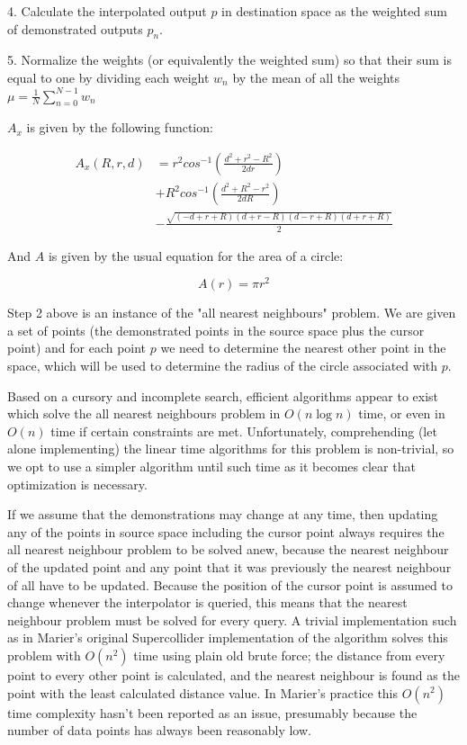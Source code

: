 \documentclass[main.tex]{subfiles}
\begin{document}
4. Calculate the interpolated output $p$ in destination space as the weighted
sum of demonstrated outputs $p_n$.

5. Normalize the weights (or equivalently the weighted sum) so that their sum
is equal to one by dividing each weight $w_n$ by the mean of all the weights
$\mu = \frac{1}{N}\sum_{n = 0}^{N - 1} w_n$

$A_x$ is given by the following function:

\[
\begin{aligned}
A_x(R, r, d) &= r^2 cos^{-1} ( \frac{d^2 + r^2 - R^2}{2dr} ) \\
             &+ R^2 cos^{-1} ( \frac{d^2 + R^2 - r^2}{2dR} ) \\
             &- \frac{\sqrt{(-d + r + R)(d + r - R)(d - r + R)(d + r + R)}}{2}
\end{aligned}
\]

And $A$ is given by the usual equation for the area of a circle:

\[
A(r) = \pi r^2
\]

Step 2 above is an instance of the "all nearest neighbours" problem. We are
given a set of points (the demonstrated points in the source space plus the
cursor point) and for each point $p$ we need to determine the nearest other
point in the space, which will be used to determine the
radius of the circle associated with $p$.

Based on a cursory and incomplete search, efficient
algorithms appear to exist which solve the all nearest neighbours problem in
$O(n\log n)$ time, or even in $O(n)$ time if certain constraints are met.
Unfortunately, comprehending (let alone implementing) the linear time
algorithms for this problem is non-trivial, so we opt to use a simpler
algorithm until such time as it becomes clear that optimization is necessary.

If we assume that the demonstrations may change at any time, then updating any
of the points in source space including the cursor point always requires the
all nearest neighbour problem to be solved anew, because the nearest neighbour of
the updated point and any point that it was previously the nearest neighbour of
all have to be updated. Because the position of the cursor point is assumed
to change whenever the interpolator is queried, this means that the nearest
neighbour problem must be solved for every query. A trivial implementation
such as in Marier's original Supercollider implementation of the
algorithm solves this problem with $O(n^2)$ time using plain old
brute force; the distance from every point to every other point is calculated,
and the nearest neighbour is found as the point with the least calculated
distance value. In Marier's practice this $O(n^2)$ time complexity hasn't been
reported as an issue, presumably because the number of data points has always
been reasonably low.
\end{document}
